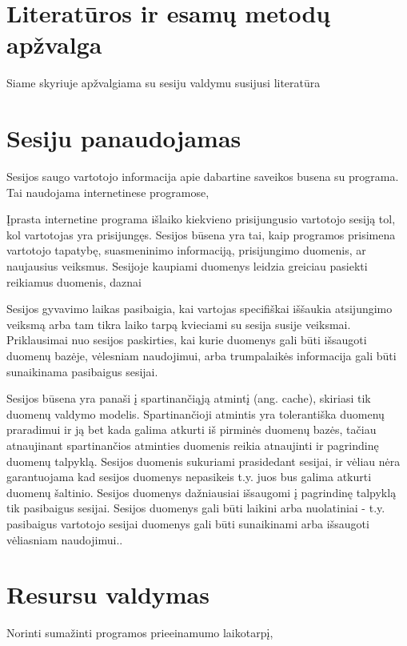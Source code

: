 \section{Literatūros ir esamų metodų apžvalga}

Siame skyriuje apžvalgiama su sesiju valdymu susijusi literatūra



\section{Sesiju panaudojamas}

Sesijos saugo vartotojo informacija apie dabartine saveikos busena su programa. Tai naudojama internetinese programose, 

Įprasta internetine programa išlaiko kiekvieno prisijungusio vartotojo sesiją tol, kol vartotojas yra prisijungęs. 
Sesijos būsena yra tai, kaip programos prisimena vartotojo tapatybę, suasmeninimo informaciją, prisijungimo duomenis, ar
naujausius veiksmus. Sesijoje kaupiami duomenys leidzia greiciau pasiekti reikiamus duomenis, daznai 

Sesijos gyvavimo laikas pasibaigia, kai vartojas specifiškai iššaukia atsijungimo veiksmą 
arba tam tikra laiko tarpą kvieciami su sesija susije veiksmai.
Priklausimai nuo sesijos paskirties, kai kurie duomenys gali būti išsaugoti duomenų bazėje, vėlesniam naudojimui, 
arba trumpalaikės informacija gali būti sunaikinama pasibaigus sesijai.

Sesijos būsena yra panaši į spartinančiąją atmintį (ang. cache), skiriasi tik duomenų valdymo modelis.
Spartinančioji atmintis yra tolerantiška duomenų praradimui ir ją bet kada galima atkurti iš pirminės duomenų bazės, 
tačiau atnaujinant spartinančios atminties duomenis reikia atnaujinti ir pagrindinę duomenų talpyklą.
Sesijos duomenis sukuriami prasidedant sesijai, ir vėliau nėra garantuojama kad sesijos duomenys nepasikeis t.y. juos bus galima atkurti duomenų šaltinio.
Sesijos duomenys dažniausiai išsaugomi į pagrindinę talpyklą tik pasibaigus sesijai.
Sesijos duomenys gali būti laikini arba nuolatiniai - t.y.  pasibaigus vartotojo sesijai duomenys gali būti sunaikinami arba išsaugoti vėliasniam naudojimui..


\section{Resursu valdymas}

Norinti sumažinti programos prieeinamumo laikotarpį, 



